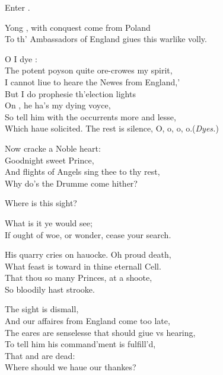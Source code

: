 \documentclass[a5paper,DIV=calc,11pt]{scrbook}
\begin{document}
\begin{drama*}
    Enter \osr.
    
    \osrspeaks Yong \for, with conquest come from Poland\\
    To th' Ambassadors of England giues this warlike volly.
    
    \hamspeaks O I dye \hor:\\
    The potent poyson quite ore-crowes my spirit,\\
    I cannot liue to heare the Newes from England,'\\
    But I do prophesie th'election lights\\
    On \for, he ha's my dying voyce,\\
    So tell him with the occurrents more and lesse,\\
    Which haue solicited. The rest is silence, O, o, o, o.\hfil(\textit{Dyes.})
    
    \horspeaks Now cracke a Noble heart:\\
    Goodnight sweet Prince,\\
    And flights of Angels sing thee to thy rest,\\
    Why do's the Drumme come hither?
    
    
    
    \forspeaks Where is this sight?
    
    \horspeaks What is it ye would see;\\
    If ought of woe, or wonder, cease your search.
    
    \forspeaks His quarry cries on hauocke. Oh proud death,\\
    What feast is toward in thine eternall Cell.\\
    That thou so many Princes, at a shoote,\\
    So bloodily hast strooke.
    
     The sight is dismall,\\
    And our affaires from England come too late,\\
    The eares are senselesse that should giue vs hearing,\\
    To tell him his command'ment is fulfill'd,\\
    That \rosin and \guil are dead:\\
    Where should we haue our thankes?
    

\end{drama*}
\end{document}
